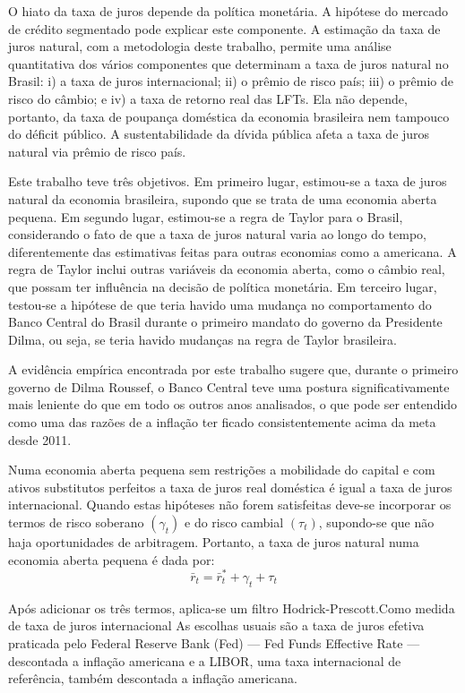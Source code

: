 \documentclass[11pt,oneside,a4paper]{article}
\begin{document}
O hiato da taxa de juros depende da política monetária. A hipótese do mercado
de crédito segmentado pode explicar este componente. A estimação da taxa de juros natural, com a metodologia deste trabalho, permite uma análise quantitativa dos vários componentes que determinam a taxa de juros natural no Brasil: i) a taxa de juros internacional; ii) o prêmio de risco país; iii) o prêmio de risco do câmbio; e iv) a taxa de retorno real das LFTs.  Ela não depende, portanto, da taxa de poupança doméstica da economia brasileira nem tampouco do déficit público. A sustentabilidade da dívida pública afeta a taxa de juros natural via prêmio de risco país.

Este trabalho teve três objetivos. Em primeiro lugar, estimou-se a taxa de juros natural da economia brasileira, supondo que se trata de uma economia aberta pequena. Em segundo lugar, estimou-se a
regra de Taylor para o Brasil, considerando o fato de que a taxa de juros natural varia ao longo do tempo, diferentemente das estimativas feitas para outras economias como a americana. A regra de Taylor inclui outras variáveis da economia aberta, como o câmbio real, que possam ter influência na decisão de
política monetária. Em terceiro lugar, testou-se a hipótese de que teria havido uma mudança no comportamento do Banco Central do Brasil durante o primeiro mandato do governo da Presidente Dilma, ou
seja, se teria havido mudanças na regra de Taylor brasileira. 

A evidência empírica encontrada por este trabalho sugere que, durante o primeiro governo de
Dilma Roussef, o Banco Central teve uma postura significativamente mais leniente do que em todo os
outros anos analisados, o que pode ser entendido como uma das razões de a inflação ter ficado consistentemente acima da meta desde 2011.

Numa economia aberta pequena sem restrições a mobilidade do capital e com ativos substitutos
perfeitos a taxa de juros real doméstica é igual a taxa de juros internacional. Quando estas hipóteses não forem satisfeitas deve-se incorporar os termos de risco soberano $(\gamma_t)$ e do risco cambial $(\tau_t)$, supondo-se que não haja oportunidades de arbitragem. Portanto, a taxa de juros natural numa economia aberta pequena é dada por:
\begin{equation}
    \bar{r}_t = \bar{r}_t^{*} + \gamma_t + \tau_t
\end{equation}

Após adicionar os três termos, aplica-se um filtro Hodrick-Prescott.Como medida de taxa de juros internacional As escolhas usuais são a taxa de juros efetiva praticada pelo Federal Reserve Bank (Fed) — Fed Funds Effective Rate — descontada a inflação americana e a LIBOR, uma taxa internacional de referência, também descontada a inflação americana.
\end{document}
